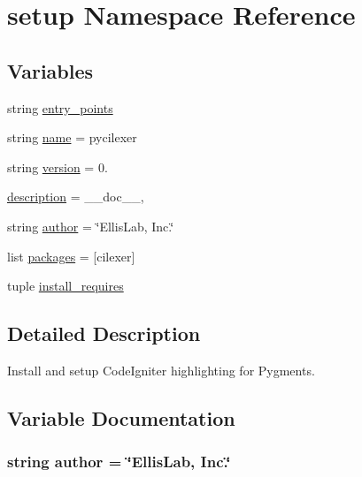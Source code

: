 \hypertarget{namespacesetup}{}\section{setup Namespace Reference}
\label{namespacesetup}
\subsection*{Variables}
\begin{DoxyCompactItemize}
\item 
string \hyperlink{namespacesetup_a0afb2eb153236846e2dd516c55a0e0dd}{entry\+\_\+points}
\item 
string \hyperlink{namespacesetup_a8ccf841cb59e451791bcb2e1ac4f1edc}{name} = \textquotesingle{}pycilexer\textquotesingle{}
\item 
string \hyperlink{namespacesetup_af9c8593b58583463efe6932e24c9d6e6}{version} = \textquotesingle{}0.\textquotesingle{}
\item 
\hyperlink{namespacesetup_a2661f439a4a94ffdcd5e47ae1da0bb1d}{description} = \+\_\+\+\_\+doc\+\_\+\+\_\+,
\item 
string \hyperlink{namespacesetup_ab873cebb3b7e47db4fe59837d1aaa210}{author} = \char`\"{}Ellis\+Lab, Inc.\char`\"{}
\item 
list \hyperlink{namespacesetup_af290766b923d1fc3f429da7bc5decf7a}{packages} = \mbox{[}\textquotesingle{}cilexer\textquotesingle{}\mbox{]}
\item 
tuple \hyperlink{namespacesetup_a0a66b558731b621d87cc2b72d0b9e1aa}{install\+\_\+requires}
\end{DoxyCompactItemize}


\subsection{Detailed Description}
\begin{DoxyVerb}Install and setup CodeIgniter highlighting for Pygments.
\end{DoxyVerb}
 

\subsection{Variable Documentation}
\hypertarget{namespacesetup_ab873cebb3b7e47db4fe59837d1aaa210}{}
\subsubsection[{author}]{\setlength{\rightskip}{0pt plus 5cm}string author = \char`\"{}Ellis\+Lab, Inc.\char`\"{}}\label{namespacesetup_ab873cebb3b7e47db4fe59837d1aaa210}
\hypertarget{namespacesetup_a2661f439a4a94ffdcd5e47ae1da0bb1d}{}
